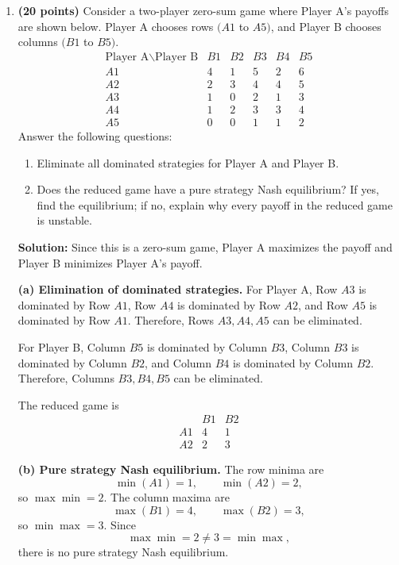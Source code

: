 \documentclass[11pt]{article}
\begin{document}
\begin{enumerate}
\vspace{1em}


\item \textbf{(20 points)} Consider a two-player zero-sum game where Player A's payoffs are shown below. Player A chooses rows $(A1$ to $A5)$, and Player B chooses columns $(B1$ to $B5)$.
\[
\begin{array}{c|ccccc}
\text{Player A}\backslash \text{Player B} & B1 & B2 & B3 & B4 & B5\\
\hline
A1 & 4 & 1 & 5 & 2 & 6\\
A2 & 2 & 3 & 4 & 4 & 5\\
A3 & 1 & 0 & 2 & 1 & 3\\
A4 & 1 & 2 & 3 & 3 & 4\\
A5 & 0 & 0 & 1 & 1 & 2
\end{array}
\]
Answer the following questions:
\begin{enumerate}
    \item[(a)] Eliminate all dominated strategies for Player A and Player B.
    \item[(b)] Does the reduced game have a pure strategy Nash equilibrium? If yes, find the equilibrium; if no, explain why every payoff in the reduced game is unstable.
\end{enumerate}

{\color{red}
\textbf{Solution:}
Since this is a zero-sum game, Player A maximizes the payoff and Player B minimizes Player A's payoff.

\textbf{(a) Elimination of dominated strategies.}
For Player A, Row $A3$ is dominated by Row $A1$, Row $A4$ is dominated by Row $A2$, and Row $A5$ is dominated by Row $A1$. Therefore, Rows $A3,A4,A5$ can be eliminated.

For Player B, Column $B5$ is dominated by Column $B3$, Column $B3$ is dominated by Column $B2$, and Column $B4$ is dominated by Column $B2$. Therefore, Columns $B3,B4,B5$ can be eliminated.

The reduced game is
\[
\begin{array}{c|cc}
 & B1 & B2\\
\hline
A1 & 4 & 1\\
A2 & 2 & 3
\end{array}
\]

\textbf{(b) Pure strategy Nash equilibrium.}
The row minima are
\[
\min(A1)=1,\qquad \min(A2)=2,
\]
so $\max\min=2$. The column maxima are
\[
\max(B1)=4,\qquad \max(B2)=3,
\]
so $\min\max=3$. Since
\[
\max\min=2\neq 3=\min\max,
\]
there is no pure strategy Nash equilibrium.

}
\end{enumerate}
\end{document}
